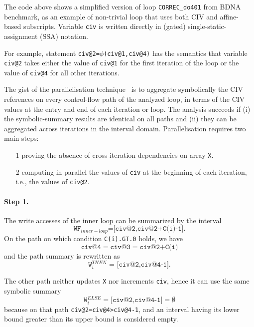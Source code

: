 The code above shows a simplified version of loop
\texttt{CORREC\_do401} from BDNA benchmark, as an example of
non-trivial loop that uses both CIV and affine-based subscripts.
Variable \texttt{civ} is written directly in (gated)
single-static-assignment (SSA) notation.

For example, statement \texttt{civ@2=$\phi$(civ@1,civ@4)} has the
semantics that variable \texttt{civ@2} takes either the value of
\texttt{civ@1} for the first iteration of the loop or the value of
\texttt{civ@4} for all other iterations.

The gist of the parallelisation technique~\cite{CIVan} is to aggregate
symbolically the CIV references on every control-flow path of the
analyzed loop, in terms of the CIV values at the entry and end of each
iteration or loop.  The analysis succeeds if (i) the symbolic-summary
results are identical on all paths and (ii) they can be aggregated
across iterations in the interval domain.
%
Parallelisation requires two main steps:
\begin{itemize}
    \item[1] proving the absence of cross-iteration dependencies 
        on array \texttt{X}. 
    \item[2] computing in parallel the values of \texttt{civ}
    at the beginning of each iteration, i.e., the values of \texttt{civ@2}. 
\end{itemize}

\paragraph{Step 1.} 
The write accesses of the inner loop can be summarized
by the interval
\[
  \texttt{WF$_{inner-loop}$=[civ@2,civ@2+C(i)-1]}.
\]
On the path on which condition \texttt{C(i).GT.0} holds, we have
\[
  \texttt{civ@4$=$civ@3$=$civ@2+C(i)}
\]
and the path summary is
rewritten as
\[
  \texttt{W$_i^{THEN}$ = [civ@2,civ@4-1]}.
\]

The other path neither updates \texttt{X} nor increments \texttt{civ},
hence it can use the same symbolic summary
\[
  \texttt{W}_i^{ELSE} = \texttt{[civ@2,civ@4-1]} = \emptyset
  \]
because on that path \texttt{civ@2=civ@4>civ@4-1}, and an interval
having its lower bound greater than its upper bound is considered
empty.

